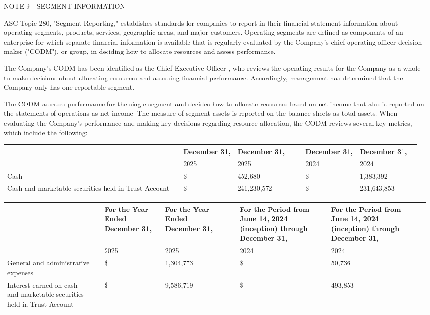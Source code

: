 \documentclass[11pt,a4paper]{article}
\begin{document}
NOTE 9 - SEGMENT INFORMATION

ASC Topic 280, "Segment Reporting," establishes standards for companies to report in their financial statement information about operating segments, products, services, geographic areas, and major customers. Operating segments are defined as components of an enterprise for which separate financial information is available that is regularly evaluated by the Company's chief operating officer decision maker ("CODM"), or group, in deciding how to allocate resources and assess performance.

The Company's CODM has been identified as the Chief Executive Officer , who reviews the operating results for the Company as a whole to make decisions about allocating resources and assessing financial performance. Accordingly, management has determined that the Company only has one reportable segment.

The CODM assesses performance for the single segment and decides how to allocate resources based on net income that also is reported on the statements of operations as net income. The measure of segment assets is reported on the balance sheets as total assets. When evaluating the Company's performance and making key decisions regarding resource allocation, the CODM reviews several key metrics, which include the following:

\begin{table}[h]
\begin{tabular}{|l|l|l|l|l|l|l|l|l|}
\hline
 &  & December 31, & December 31, &  &  & December 31, & December 31, &  \\ \hline
 &  & 2025 & 2025 &  &  & 2024 & 2024 &  \\ \hline
Cash &  & \$ & 452,680 &  &  & \$ & 1,383,392 &  \\ \hline
Cash and marketable securities held in Trust Account &  & \$ & 241,230,572 &  &  & \$ & 231,643,853 &  \\ \hline
\end{tabular}
\end{table}

\begin{table}[h]
\begin{tabular}{|l|l|l|l|l|l|l|l|l|}
\hline
 &  & For the Year Ended December 31, & For the Year Ended December 31, &  &  & For the Period from June 14, 2024 (inception) through December 31, & For the Period from June 14, 2024 (inception) through December 31, &  \\ \hline
 &  & 2025 & 2025 &  &  & 2024 & 2024 &  \\ \hline
General and administrative expenses &  & \$ & 1,304,773 &  &  & \$ & 50,736 &  \\ \hline
Interest earned on cash and marketable securities held in Trust Account &  & \$ & 9,586,719 &  &  & \$ & 493,853 &  \\ \hline
\end{tabular}
\end{table}
\end{document}
